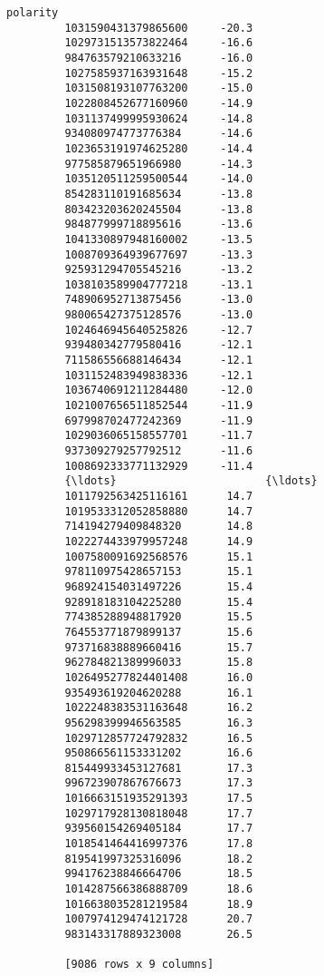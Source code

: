 \documentclass[11pt]{article}
\begin{document}
\begin{Verbatim}[commandchars=\\\{\}]
                              polarity  
         1031590431379865600     -20.3  
         1029731513573822464     -16.6  
         984763579210633216      -16.0  
         1027585937163931648     -15.2  
         1031508193107763200     -15.0  
         1022808452677160960     -14.9  
         1031137499995930624     -14.8  
         934080974773776384      -14.6  
         1023653191974625280     -14.4  
         977585879651966980      -14.3  
         1035120511259500544     -14.0  
         854283110191685634      -13.8  
         803423203620245504      -13.8  
         984877999718895616      -13.6  
         1041330897948160002     -13.5  
         1008709364939677697     -13.3  
         925931294705545216      -13.2  
         1038103589904777218     -13.1  
         748906952713875456      -13.0  
         980065427375128576      -13.0  
         1024646945640525826     -12.7  
         939480342779580416      -12.1  
         711586556688146434      -12.1  
         1031152483949838336     -12.1  
         1036740691211284480     -12.0  
         1021007656511852544     -11.9  
         697998702477242369      -11.9  
         1029036065158557701     -11.7  
         937309279257792512      -11.6  
         1008692333771132929     -11.4  
         {\ldots}                       {\ldots}  
         1011792563425116161      14.7  
         1019533312052858880      14.7  
         714194279409848320       14.8  
         1022274433979957248      14.9  
         1007580091692568576      15.1  
         978110975428657153       15.1  
         968924154031497226       15.4  
         928918183104225280       15.4  
         774385288948817920       15.5  
         764553771879899137       15.6  
         973716838889660416       15.7  
         962784821389996033       15.8  
         1026495277824401408      16.0  
         935493619204620288       16.1  
         1022248383531163648      16.2  
         956298399946563585       16.3  
         1029712857724792832      16.5  
         950866561153331202       16.6  
         815449933453127681       17.3  
         996723907867676673       17.3  
         1016663151935291393      17.5  
         1029717928130818048      17.7  
         939560154269405184       17.7  
         1018541464416997376      17.8  
         819541997325316096       18.2  
         994176238846664706       18.5  
         1014287566386888709      18.6  
         1016638035281219584      18.9  
         1007974129474121728      20.7  
         983143317889323008       26.5  
         
         [9086 rows x 9 columns]
\end{Verbatim}
            
\end{document}
